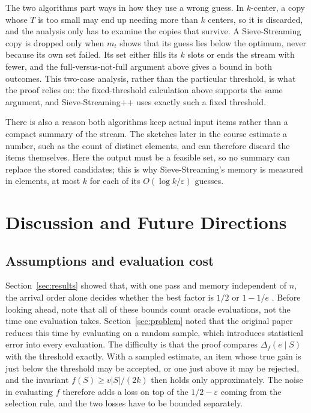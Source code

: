 \documentclass[10pt]{article}
\newcommand{\marg}[2]{\Delta_f(#1\mid #2)}
\begin{document}
The two algorithms part ways in how they use a wrong guess. In $k$-center, a copy whose $T$ is too small may end up needing more than $k$ centers, so it is discarded, and the analysis only has to examine the copies that survive. A Sieve-Streaming copy is dropped only when $m_t$ shows that its guess lies below the optimum, never because its own set failed. Its set either fills its $k$ slots or ends the stream with fewer, and the full-versus-not-full argument above gives a bound in both outcomes. This two-case analysis, rather than the particular threshold, is what the proof relies on: the fixed-threshold calculation above supports the same argument, and Sieve-Streaming++ uses exactly such a fixed threshold.

There is also a reason both algorithms keep actual input items rather than a compact summary of the stream. The sketches later in the course estimate a number, such as the count of distinct elements, and can therefore discard the items themselves. Here the output must be a feasible set, so no summary can replace the stored candidates; this is why Sieve-Streaming's memory is measured in elements, at most $k$ for each of its $O(\log k/\varepsilon)$ guesses.

\section{Discussion and Future Directions}
\label{sec:discussion}
\subsection{Assumptions and evaluation cost}
\label{sec:assumptions}
Section~\ref{sec:results} showed that, with one pass and memory independent of $n$, the arrival order alone decides whether the best factor is $1/2$ or $1-1/e$ \cite{feldman2020oneway,liu2021random}. Before looking ahead, note that all of these bounds count oracle evaluations, not the time one evaluation takes. Section~\ref{sec:problem} noted that the original paper reduces this time by evaluating on a random sample, which introduces statistical error into every evaluation. The difficulty is that the proof compares $\marg{e}{S}$ with the threshold exactly. With a sampled estimate, an item whose true gain is just below the threshold may be accepted, or one just above it may be rejected, and the invariant $f(S)\geq v|S|/(2k)$ then holds only approximately. The noise in evaluating $f$ therefore adds a loss on top of the $1/2-\varepsilon$ coming from the selection rule, and the two losses have to be bounded separately.
\end{document}
